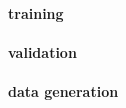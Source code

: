 \documentclass{article}
\begin{document}
\paragraph{training}
\paragraph{validation}
\paragraph{data generation}







\end{document}
